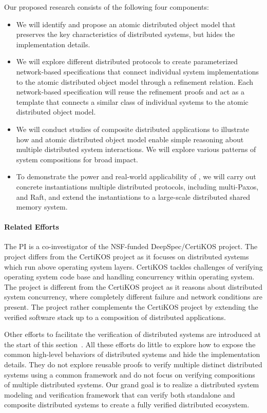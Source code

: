 \documentclass[11pt]{article}
\begin{document}
Our proposed research consists of the following four components:
\begin{itemize}%
\item We will identify and propose an atomic distributed object model
  that preserves the key characteristics of distributed systems, but
  hides the implementation details.
\item We will explore different distributed protocols to create
  parameterized network-based specifications that connect individual
  system implementations to the atomic distributed object model
  through a refinement relation. Each network-based specification will
  reuse the refinement proofs and act as a template that connects a
  similar class of individual systems to the atomic distributed object
  model.
\item We will conduct studies of composite distributed applications to
  illustrate how \sysname{} and atomic distributed object model enable
  simple reasoning about multiple distributed system interactions. We
  will explore various patterns of system compositions for broad
  impact.
\item To demonstrate the power and real-world applicability of
  \sysname{}, we will carry out concrete instantiations multiple
  distributed protocols, including multi-Paxos, and Raft, and extend
  the instantiations to a large-scale distributed shared memory
  system.
\end{itemize}

\paragraph{Related Efforts} The PI is a co-investigator of the NSF-funded DeepSpec/CertiKOS project. 
The \sysname{} project differs from the CertiKOS project as it focuses
on distributed systems which run above operating system
layers. CertiKOS tackles challenges of verifying operating system code
base and handling concurrency within operating system. The \sysname{}
project is different from the CertiKOS project as it reasons about
distributed system concurrency, where completely different failure and
network conditions are present. The \sysname{} project rather
complements the CertiKOS project by extending the verified software
stack up to a composition of distributed applications.

Other efforts to facilitate the verification of distributed systems
are introduced at the start of this section~\cite{ironfleet, verdi,
  i4, disel}. All these efforts do little to explore how to expose the
common high-level behaviors of distributed systems and hide the
implementation details. They do not explore reusable proofs to verify
multiple distinct distributed systems using a common framework and do
not focus on verifying compositions of multiple distributed
systems. Our grand goal is to realize a distributed system modeling
and verification framework that can verify both standalone and
composite distributed systems to create a fully verified distributed
ecosystem.
\end{document}
